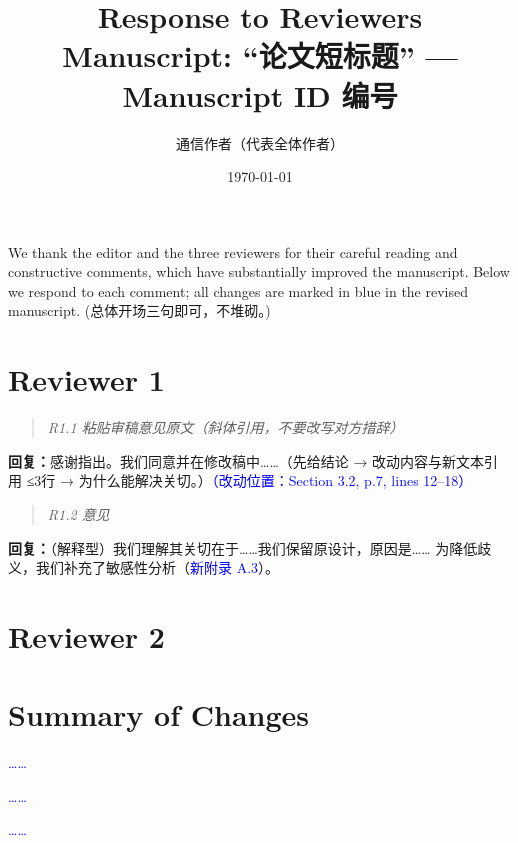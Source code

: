 \documentclass[11pt]{article}
\title{Response to Reviewers\\
\large Manuscript: ``{{论文短标题}}'' — Manuscript ID {{编号}}}
\author{通信作者（代表全体作者）}
\date{\today}
\newenvironment{reviewer}{\begin{quote}\itshape}{\end{quote}}
\newcommand{\resp}[1]{\noindent\textbf{回复：}#1\par\medskip}
\newcommand{\change}[1]{\textcolor{blue}{#1}}   %
\newcommand{\loc}[1]{\textcolor{blue}{（改动位置：#1）}}
\begin{document}
\maketitle

We thank the editor and the three reviewers for their careful reading and
constructive comments, which have substantially improved the manuscript.
Below we respond to each comment; all changes are marked in blue in the
revised manuscript. (总体开场三句即可，不堆砌。)

\section*{Reviewer 1}

\begin{reviewer}
R1.1 {{粘贴审稿意见原文（斜体引用，不要改写对方措辞）}}
\end{reviewer}
\resp{感谢指出。我们同意并在修改稿中……（先给结论 → 改动内容与新文本引用
≤3行 → 为什么能解决关切。）\loc{Section 3.2, p.7, lines 12--18}}

\begin{reviewer}
R1.2 {{意见}}
\end{reviewer}
\resp{（解释型）我们理解其关切在于……我们保留原设计，原因是……
为降低歧义，我们补充了敏感性分析（\change{新附录 A.3}）。}

\section*{Reviewer 2}

\section*{Summary of Changes}
\begin{description}[style=nextline, leftmargin=1.5em]
  \item[方法与理论] \change{……}
  \item[模拟与数据] \change{……}
  \item[表述与格式] \change{……}
\end{description}
\end{document}
